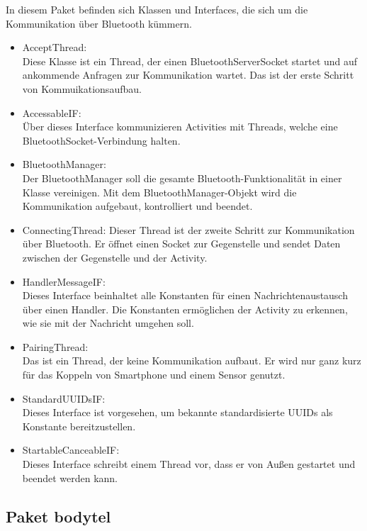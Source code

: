 In diesem Paket befinden sich Klassen und Interfaces, die sich um die Kommunikation \"uber Bluetooth k\"ummern.
\begin{itemize}
 \item AcceptThread:\\
 Diese Klasse ist ein Thread, der einen BluetoothServerSocket startet und auf ankommende Anfragen zur Kommunikation wartet.
 Das ist der erste Schritt von Kommuikationsaufbau.
 
 \item AccessableIF:\\
 \"Uber dieses Interface kommunizieren Activities mit Threads, welche eine BluetoothSocket-Verbindung halten.
 
 \item BluetoothManager:\\
 Der BluetoothManager soll die gesamte Bluetooth-Funktionalit\"at in einer Klasse vereinigen.
 Mit dem BluetoothManager-Objekt wird die Kommunikation aufgebaut, kontrolliert und beendet.
 
 \item ConnectingThread:
 Dieser Thread ist der zweite Schritt zur Kommunikation \"uber Bluetooth.
 Er \"offnet einen Socket zur Gegenstelle und sendet Daten zwischen der Gegenstelle und der Activity.
 
 \item HandlerMessageIF:\\
 Dieses Interface beinhaltet alle Konstanten f\"ur einen Nachrichtenaustausch \"uber einen Handler.
 Die Konstanten erm\"oglichen der Activity zu erkennen, wie sie mit der Nachricht umgehen soll.
 
 \item PairingThread:\\
 Das ist ein Thread, der keine Kommunikation aufbaut.
 Er wird nur ganz kurz f\"ur das Koppeln von Smartphone und einem Sensor genutzt.

 \item StandardUUIDsIF:\\
 Dieses Interface ist vorgesehen, um bekannte standardisierte UUIDs als Konstante bereitzustellen.
 
 \item StartableCanceableIF:\\
 Dieses Interface schreibt einem Thread vor, dass er von Au\ss{}en gestartet und beendet werden kann.
\end{itemize}

\subsection*{Paket bodytel}

